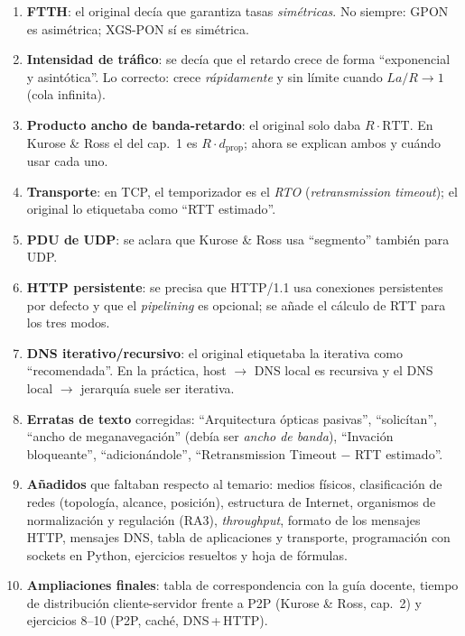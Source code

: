 \documentclass[11pt,a4paper]{article}
\begin{document}
\begin{nota}
\begin{enumerate}[leftmargin=1.6em]
  \item \textbf{FTTH}: el original decía que garantiza tasas \emph{simétricas}. No siempre: GPON es asimétrica; XGS-PON sí es simétrica.
  \item \textbf{Intensidad de tráfico}: se decía que el retardo crece de forma ``exponencial y asintótica''. Lo correcto: crece \emph{rápidamente} y sin límite cuando $La/R\to1$ (cola infinita).
  \item \textbf{Producto ancho de banda-retardo}: el original solo daba $R\cdot\text{RTT}$. En Kurose \& Ross el del cap.~1 es $R\cdot d_{\text{prop}}$; ahora se explican ambos y cuándo usar cada uno.
  \item \textbf{Transporte}: en TCP, el temporizador es el \emph{RTO} (\textit{retransmission timeout}); el original lo etiquetaba como ``RTT estimado''.
  \item \textbf{PDU de UDP}: se aclara que Kurose \& Ross usa ``segmento'' también para UDP.
  \item \textbf{HTTP persistente}: se precisa que HTTP/1.1 usa conexiones persistentes por defecto y que el \emph{pipelining} es opcional; se añade el cálculo de RTT para los tres modos.
  \item \textbf{DNS iterativo/recursivo}: el original etiquetaba la iterativa como ``recomendada''. En la práctica, host $\to$ DNS local es recursiva y el DNS local $\to$ jerarquía suele ser iterativa.
  \item \textbf{Erratas de texto} corregidas: ``Arquitectura ópticas pasivas'', ``solicítan'', ``ancho de meganavegación'' (debía ser \emph{ancho de banda}), ``Invación bloqueante'', ``adicionándole'', ``Retransmission Timeout $-$ RTT estimado''.
  \item \textbf{Añadidos} que faltaban respecto al temario: medios físicos, clasificación de redes (topología, alcance, posición), estructura de Internet, organismos de normalización y regulación (RA3), \emph{throughput}, formato de los mensajes HTTP, mensajes DNS, tabla de aplicaciones y transporte, programación con sockets en Python, ejercicios resueltos y hoja de fórmulas.
  \item \textbf{Ampliaciones finales}: tabla de correspondencia con la guía docente, tiempo de distribución cliente-servidor frente a P2P (Kurose \& Ross, cap.~2) y ejercicios 8--10 (P2P, caché, DNS\,+\,HTTP).
\end{enumerate}
\end{nota}
\end{document}
